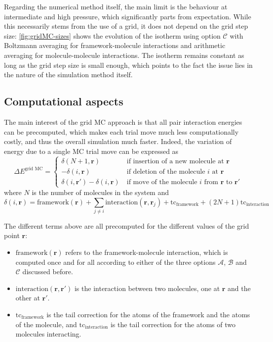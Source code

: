 \documentclass[main.tex]{subfiles}
\begin{document}
Regarding the numerical method itself, the main limit is the behaviour at intermediate and high pressure, which significantly parts from expectation. While this necessarily stems from the use of a grid, it does not depend on the grid step size: \cref{fig:gridMC-sizes} shows the evolution of the isotherm using option $\mathscr C$ with Boltzmann averaging for framework-molecule interactions and arithmetic averaging for molecule-molecule interactions. The isotherm remains constant as long as the grid step size is small enough, which points to the fact the issue lies in the nature of the simulation method itself.

\subsection{Computational aspects}

The main interest of the grid MC approach is that all pair interaction energies can be precomputed, which makes each trial move much less computationally costly, and thus the overall simulation much faster. Indeed, the variation of energy due to a single MC trial move can be expressed as
\[\Delta E^\text{grid MC} = \left\{\begin{split}
	\delta(N+1, \boldsymbol r)\ &\text{if insertion of a new molecule at }\boldsymbol r\\
	-\delta(i, \boldsymbol r)\ &\text{if deletion of the molecule }i\text{ at }\boldsymbol r\\
	\delta(i, \boldsymbol r') - \delta(i, \boldsymbol r)\ &\text{if move of the molecule }i\text{ from }\boldsymbol r\text{ to }\boldsymbol r'
\end{split}\right.\]
where $N$ is the number of molecules in the system and
\[\delta(i, \boldsymbol r) = \text{framework}(\boldsymbol r) + \sum_{j\neq i} \text{interaction}(\boldsymbol r, \boldsymbol r_j) + \text{tc}_\text{framework} + (2N+1)\text{tc}_\text{interaction}\]

The different terms above are all precomputed for the different values of the grid point $\boldsymbol r$:
\begin{itemize}
	\item $\text{framework}(\boldsymbol r)$ refers to the framework-molecule interaction, which is computed once and for all according to either of the three options $\mathscr A$, $\mathscr B$ and $\mathscr C$ discussed before.
	\item $\text{interaction}(\boldsymbol r, \boldsymbol r')$ is the interaction between two molecules, one at $\boldsymbol r$ and the other at $\boldsymbol r'$.
	\item $\text{tc}_\text{framework}$ is the tail correction for the atoms of the framework and the atoms of the molecule, and $\text{tc}_\text{interaction}$ is the tail correction for the atoms of two molecules interacting.
\end{itemize}
\end{document}

